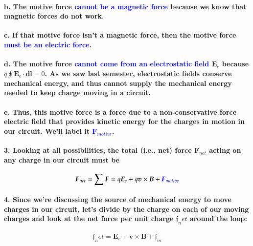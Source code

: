 \documentclass{article}
\begin{document}
\paragraph{\indent b. The motive force \textcolor{blue}{cannot be a magnetic force} because we know that magnetic forces do not work.}
\paragraph{\indent c. If that motive force isn't a magnetic force, then the motive force \textcolor{blue}{must be an electric force}.}
\paragraph{\indent d. The motive force \textcolor{blue}{cannot come from an electrostatic field} $\boldsymbol{E}_c$ because $q\oint\boldsymbol{E}_c\cdot\boldsymbol{dl}=0$. As we saw last semester, electrostatic fields conserve mechanical energy, and thus cannot supply the mechanical energy needed to keep charge moving in a circuit.}
\paragraph{\indent e. Thus, this motive force is a force due to a non-conservative force electric field that provides kinetic energy for the charges in motion in our circuit. We'll label it \textcolor{blue}{$\boldsymbol{F}_{motive}$}.}
\paragraph{3. Looking at all possibilities, the total (i.e., net) force $\boldsymbol{F}_{net}$ acting on any charge in our circuit must be}
\begin{equation*}
    \boldsymbol{F}_{net}=\sum\boldsymbol{F}=q\boldsymbol{E}_c+q\boldsymbol{v}\times\boldsymbol{B}+\textcolor{blue}{\boldsymbol{F}_{motive}}
\end{equation*}
\paragraph{4. Since we're discussing the source of mechanical energy to move charges in our circuit, let's divide by the charge on each of our moving charges  and look at the net force per unit charge $\boldsymbol{\mathfrak{f}}_net$ around the loop:}
\begin{equation*}
    \boldsymbol{\mathfrak{f}}_net=\boldsymbol{E}_c+\boldsymbol{v}\times\boldsymbol{B}+\boldsymbol{\mathfrak{f}}_m
\end{equation*}
\end{document}
